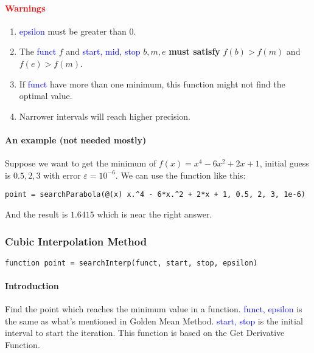 \documentclass{article}
\begin{document}
\paragraph{\textcolor{red}{Warnings}}
\begin{enumerate}
    \item \textcolor{blue}{epsilon} must be greater than $0$. 
    \item The \textcolor{blue}{funct} $f$ and \textcolor{blue}{start, mid, stop} $b, m, e$ \textbf{must satisfy} $f(b) > f(m)$ and $f(e) > f(m)$.
    \item If \textcolor{blue}{funct} have more than one minimum, this function might not find the optimal value.
    \item Narrower intervals will reach higher precision.
\end{enumerate}

\paragraph{An example (not needed mostly)}
Suppose we want to get the minimum of $f(x) = x^4 - 6x^2 + 2x + 1$, initial guess is $0.5, 2, 3$ with error $\varepsilon = 10^{-6}$. We can use the function like this:
\begin{verbatim}
point = searchParabola(@(x) x.^4 - 6*x.^2 + 2*x + 1, 0.5, 2, 3, 1e-6)
\end{verbatim}

And the result is $1.6415$ which is near the right answer.

\subsubsection{Cubic Interpolation Method}
\begin{verbatim}
function point = searchInterp(funct, start, stop, epsilon)
\end{verbatim}

\paragraph{Introduction}
Find the point which reaches the minimum value in a function. \textcolor{blue}{funct, epsilon} is the same as what's mentioned in Golden Mean Method. \textcolor{blue}{start, stop} is the initial interval to start the iteration. This function is based on the Get Derivative Function.
\end{document}
